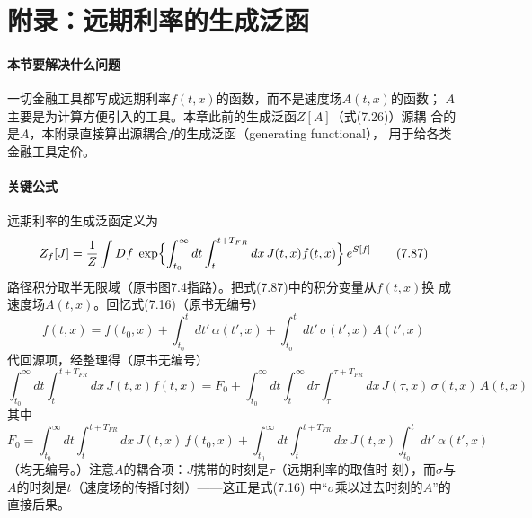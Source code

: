 \section{附录：远期利率的生成泛函}

\paragraph{本节要解决什么问题}
一切金融工具都写成远期利率$f(t,x)$的函数，而不是速度场$A(t,x)$的函数；
$A$主要是为计算方便引入的工具。本章此前的生成泛函$Z[A]$（式(7.26)）源耦
合的是$A$，本附录直接算出源耦合$f$的生成泛函（generating functional），
用于给各类金融工具定价。

\paragraph{关键公式}
远期利率的生成泛函定义为
\begin{equation*}
Z_{f}[J]=\frac{1}{Z}\int Df\;\exp\Bigl\{\int_{t_{0}}^{\infty}dt
\int_{t}^{t+T_{FR}}dx\,J(t,x)f(t,x)\Bigr\}\,e^{S[f]}
\tag{7.87}
\end{equation*}
路径积分取半无限域（原书图7.4指路）。把式(7.87)中的积分变量从$f(t,x)$换
成速度场$A(t,x)$。回忆式(7.16)（原书无编号）
\begin{equation*}
f(t,x)=f(t_{0},x)+\int_{t_{0}}^{t}dt'\,\alpha(t',x)
+\int_{t_{0}}^{t}dt'\,\sigma(t',x)\,A(t',x)
\end{equation*}
代回源项，经整理得（原书无编号）
\begin{equation*}
\int_{t_{0}}^{\infty}dt\int_{t}^{t+T_{FR}}dx\,J(t,x)f(t,x)=F_{0}
+\int_{t_{0}}^{\infty}dt\int_{t}^{\infty}d\tau\int_{\tau}^{\tau+T_{FR}}dx\,
J(\tau,x)\,\sigma(t,x)\,A(t,x)
\end{equation*}
其中
\begin{equation*}
F_{0}=\int_{t_{0}}^{\infty}dt\int_{t}^{t+T_{FR}}dx\,J(t,x)\,f(t_{0},x)
+\int_{t_{0}}^{\infty}dt\int_{t}^{t+T_{FR}}dx\,J(t,x)
\int_{t_{0}}^{t}dt'\,\alpha(t',x)
\end{equation*}
（均无编号。）注意$A$的耦合项：$J$携带的时刻是$\tau$（远期利率的取值时
刻），而$\sigma$与$A$的时刻是$t$（速度场的传播时刻）——这正是式(7.16)
中“$\sigma$乘以过去时刻的$A$”的直接后果。

